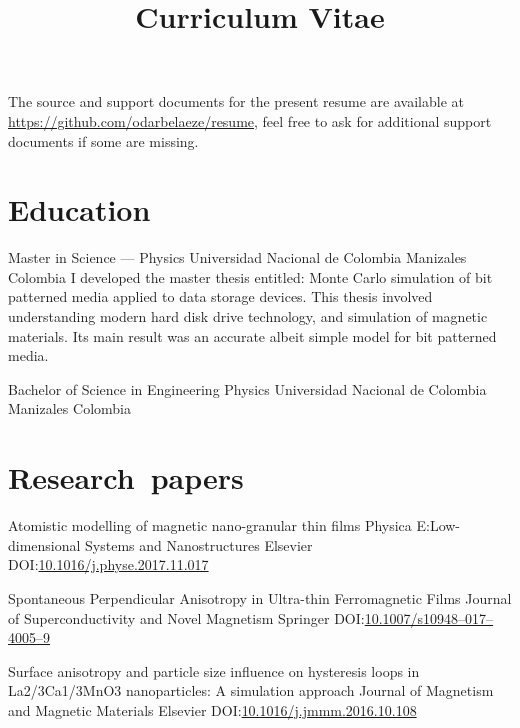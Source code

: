 \documentclass[12pt,english]{moderncv}
\title{Curriculum Vitae}
\begin{document}
\maketitle

\begin{centering}
    The source and support documents for the present resume are available at
    \url{https://github.com/odarbelaeze/resume}, feel free to ask for
    additional support documents if some are missing.
\end{centering}


\section{Education}

        {Master in Science --- Physics}
        {Universidad Nacional de Colombia}
        {Manizales}
        {Colombia}
        {%
            I developed the master thesis entitled: Monte Carlo simulation of
            bit patterned media applied to data storage devices. This thesis
            involved understanding modern hard disk drive technology, and
            simulation of magnetic materials. Its main result was an accurate
            albeit simple model for bit patterned media.
        }

        {Bachelor of Science in Engineering Physics}
        {Universidad Nacional de Colombia}
        {Manizales}
        {Colombia}
        {}


\section{Research~papers}

        {Atomistic modelling of magnetic nano-granular thin films}
        {Physica E:\@ Low-dimensional Systems and Nanostructures}
        {Elsevier}
        {}
        {DOI:\@ \href{https://doi.org/10.1016/j.physe.2017.11.017}{10.1016/j.physe.2017.11.017}}

        {%
            Spontaneous Perpendicular Anisotropy in Ultra-thin Ferromagnetic
            Films%
        }
        {Journal of Superconductivity and Novel Magnetism}
        {Springer}
        {}
        {DOI:\@ \href{https://doi.org/10.1007/s10948-017-4005-9}{10.1007/s10948--017--4005--9}}

        {%
            Surface anisotropy and particle size influence on hysteresis loops
            in La2/3Ca1/3MnO3 nanoparticles: A simulation approach%
        }
        {Journal of Magnetism and Magnetic Materials}
        {Elsevier}
        {}
        {DOI:\@ \href{https://doi.org/10.1016/j.jmmm.2016.10.108}{10.1016/j.jmmm.2016.10.108}}
\end{document}
